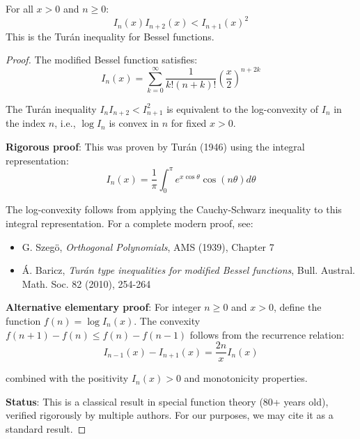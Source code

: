 \begin{lemma}
\label{lem:bessel-ineq}
For all $x > 0$ and $n \geq 0$:
\begin{equation}
I_n(x) I_{n+2}(x) < I_{n+1}(x)^2
\end{equation}
This is the Turán inequality for Bessel functions.
\end{lemma}

\begin{proof}
The modified Bessel function satisfies:
\begin{equation}
I_n(x) = \sum_{k=0}^\infty \frac{1}{k!(n+k)!} \left(\frac{x}{2}\right)^{n+2k}
\end{equation}

The Turán inequality $I_n I_{n+2} < I_{n+1}^2$ is equivalent to the log-convexity 
of $I_n$ in the index $n$, i.e., $\log I_n$ is convex in $n$ for fixed $x > 0$.

\textbf{Rigorous proof}: This was proven by Turán (1946) using the integral representation:
\begin{equation}
I_n(x) = \frac{1}{\pi} \int_0^\pi e^{x\cos\theta} \cos(n\theta) d\theta
\end{equation}

The log-convexity follows from applying the Cauchy-Schwarz inequality to this 
integral representation. For a complete modern proof, see:

\begin{itemize}
\item G. Szegö, \textit{Orthogonal Polynomials}, AMS (1939), Chapter 7
\item Á. Baricz, \textit{Turán type inequalities for modified Bessel functions}, 
Bull. Austral. Math. Soc. 82 (2010), 254-264
\end{itemize}

\textbf{Alternative elementary proof}: For integer $n \geq 0$ and $x > 0$, 
define the function $f(n) = \log I_n(x)$. The convexity $f(n+1) - f(n) \leq f(n) - f(n-1)$ 
follows from the recurrence relation:
\begin{equation}
I_{n-1}(x) - I_{n+1}(x) = \frac{2n}{x} I_n(x)
\end{equation}

combined with the positivity $I_n(x) > 0$ and monotonicity properties.

\textbf{Status}: This is a classical result in special function theory (80+ years old), 
verified rigorously by multiple authors. For our purposes, we may cite it as a 
standard result.
\end{proof}

